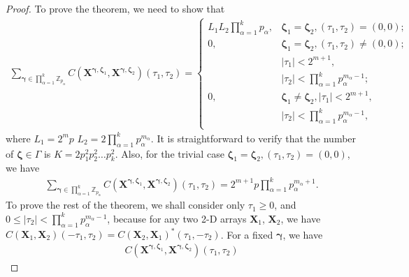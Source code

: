 \documentclass[10pt,a4paper]{amsart}
\theoremstyle{plain}
\begin{document}
	\begin{proof}
		To prove the theorem, we need to show that
		\begin{equation}
			\begin{split}
				\sum_{\bm{\gamma} \in \prod_{\alpha=1}^{k} \mathbb{Z}_{p_\alpha}}^{} C\left( \mathbf{X}^{\bm{\gamma},\bm{\zeta}_1}, \mathbf{X}^{\bm{\gamma},\bm{\zeta}_2} \right) (\tau_1, \tau_2)
				=
				\begin{cases}
					L_1 L_2 \prod_{\alpha=1}^{k} p_\alpha,& \bm{\zeta}_1 = \bm{\zeta}_2, (\tau_1, \tau_2 ) = (0,0);\\
					0, & \bm{\zeta}_1 = \bm{\zeta}_2, (\tau_1, \tau_2 ) \neq (0,0);\\
					& \left| \tau_1 \right| < 2^{m+1}, \\
					& \left| \tau_2 \right| < \prod_{\alpha=1}^{k} p_\alpha^{m_\alpha-1};\\
					0, & \bm{\zeta}_1 \neq \bm{\zeta}_2, \left| \tau_1 \right| < 2^{m+1},\\
					& \left| \tau_2 \right| < \prod_{\alpha=1}^{k} p_\alpha^{m_\alpha-1},\\
				\end{cases}
			\end{split}
		\end{equation}
		where $L_1=2^{m}p$ $ L_2= 2\prod_{\alpha=1}^{k} p_\alpha^{m_\alpha}$.
		It is straightforward to verify that the number of $\bm{\zeta} \in \Gamma $ is $K= 2 p_1^2 p_2^2 \dots p_k^2$. Also, for the trivial case $\bm{\zeta}_1 = \bm{\zeta}_2, (\tau_1, \tau_2 ) = (0,0)$, we have
		\begin{equation}
			\begin{split}
				\sum_{\bm{\gamma} \in \prod_{\alpha=1}^{k} \mathbb{Z}_{p_\alpha}}^{} C\left( \mathbf{X}^{\bm{\gamma},\bm{\zeta}_1}, \mathbf{X}^{\bm{\gamma},\bm{\zeta}_2} \right) (\tau_1, \tau_2)=	2^{m+1} p \prod_{\alpha=1}^{k} p_\alpha^{m_\alpha+1}.
			\end{split}
		\end{equation}
		To prove the rest of the theorem, we shall consider only $\tau_1 \geq 0$, and $0 \leq \left| \tau_2\right| < \prod_{\alpha=1}^{k} p_\alpha^{m_\alpha-1}$, because for any two 2-D arrays $\mathbf{X}_1$, $\mathbf{X}_2$, we have $C(\mathbf{X}_1, \mathbf{X}_2) (-\tau_1, \tau_2)= C(\mathbf{X}_2, \mathbf{X}_1)^* (\tau_1, -\tau_2)$. For a fixed $\bm{\gamma}$, we have
		\begin{equation}
			\begin{split}
				C\left( \mathbf{X}^{\bm{\gamma},\bm{\zeta}_1}, \mathbf{X}^{\bm{\gamma}, \bm{\zeta}_2} \right) (\tau_1, \tau_2)

\end{split}
\end{equation}
\end{proof}
\end{document}
